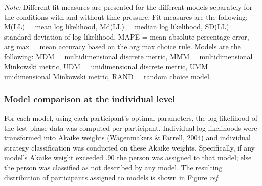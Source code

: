\documentclass[a4paper,man,natbib]{apa6}
\begin{document}
\begin{table}[ht]
\caption{Descriptive model fit measures}
\label{tab:model_fit_agg}
\centering
{}
\begin{tablenotes}
 \emph{Note:} Different fit measures are presented for the different models separately for the conditions with and without time pressure. Fit measures are the following: M(LL) = mean log likelihood, Md(LL) = median log likelihood, SD(LL) = standard deviation of log likelihood, MAPE = mean absolute percentage error, arg max = mean accuracy based on the arg max choice rule. Models are the following: MDM = multidimensional discrete metric, MMM = multidimensional Minkowski metric, UDM = unidimensional discrete metric, UMM = unidimensional Minkowski metric, RAND = random choice model. 
\end{tablenotes}
\end{table}

\subsubsection{Model comparison at the individual level}
For each model, using each participant's optimal parameters, the log likelihood of the test phase data was computed per participant. Individual log likelihoods were transformed into Akaike weights (Wagenmakers \& Farrell, 2004) and individual strategy classification was conducted on these Akaike weights. Specifically, if any model’s Akaike weight exceeded .90 the person was assigned to that model; else the person was classified as not described by any model. The resulting distribution of participants assigned to models is shown in Figure \textit{ref}.
\end{document}

